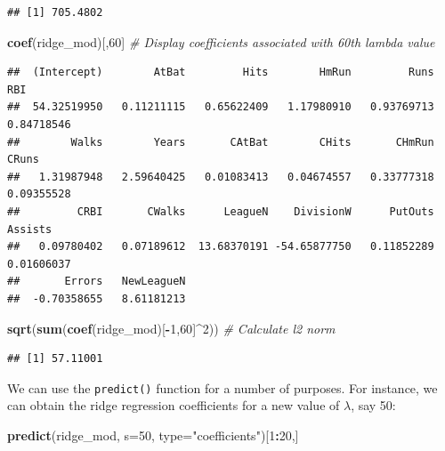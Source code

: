 \documentclass[
  openany]{book}
\newenvironment{Shaded}{\begin{snugshade}}{\end{snugshade}}
\newcommand{\CommentTok}[1]{\textcolor[rgb]{0.56,0.35,0.01}{\textit{#1}}}
\newcommand{\DataTypeTok}[1]{\textcolor[rgb]{0.13,0.29,0.53}{#1}}
\newcommand{\DecValTok}[1]{\textcolor[rgb]{0.00,0.00,0.81}{#1}}
\newcommand{\KeywordTok}[1]{\textcolor[rgb]{0.13,0.29,0.53}{\textbf{#1}}}
\newcommand{\NormalTok}[1]{#1}
\newcommand{\OperatorTok}[1]{\textcolor[rgb]{0.81,0.36,0.00}{\textbf{#1}}}
\newcommand{\StringTok}[1]{\textcolor[rgb]{0.31,0.60,0.02}{#1}}
\begin{document}
\begin{Shaded}
\end{Shaded}

\begin{verbatim}
## [1] 705.4802
\end{verbatim}

\begin{Shaded}
\begin{Highlighting}[]
\KeywordTok{coef}\NormalTok{(ridge_mod)[,}\DecValTok{60}\NormalTok{] }\CommentTok{# Display coefficients associated with 60th lambda value}
\end{Highlighting}
\end{Shaded}

\begin{verbatim}
##  (Intercept)        AtBat         Hits        HmRun         Runs          RBI 
##  54.32519950   0.11211115   0.65622409   1.17980910   0.93769713   0.84718546 
##        Walks        Years       CAtBat        CHits       CHmRun        CRuns 
##   1.31987948   2.59640425   0.01083413   0.04674557   0.33777318   0.09355528 
##         CRBI       CWalks      LeagueN    DivisionW      PutOuts      Assists 
##   0.09780402   0.07189612  13.68370191 -54.65877750   0.11852289   0.01606037 
##       Errors   NewLeagueN 
##  -0.70358655   8.61181213
\end{verbatim}

\begin{Shaded}
\begin{Highlighting}[]
\KeywordTok{sqrt}\NormalTok{(}\KeywordTok{sum}\NormalTok{(}\KeywordTok{coef}\NormalTok{(ridge_mod)[}\OperatorTok{-}\DecValTok{1}\NormalTok{,}\DecValTok{60}\NormalTok{]}\OperatorTok{^}\DecValTok{2}\NormalTok{)) }\CommentTok{# Calculate l2 norm}
\end{Highlighting}
\end{Shaded}

\begin{verbatim}
## [1] 57.11001
\end{verbatim}

We can use the \texttt{predict()} function for a number of purposes. For instance,
we can obtain the ridge regression coefficients for a new value of \(\lambda\), say 50:

\begin{Shaded}
\begin{Highlighting}[]
\KeywordTok{predict}\NormalTok{(ridge_mod, }\DataTypeTok{s=}\DecValTok{50}\NormalTok{, }\DataTypeTok{type=}\StringTok{"coefficients"}\NormalTok{)[}\DecValTok{1}\OperatorTok{:}\DecValTok{20}\NormalTok{,]}
\end{Highlighting}
\end{Shaded}
\end{document}
